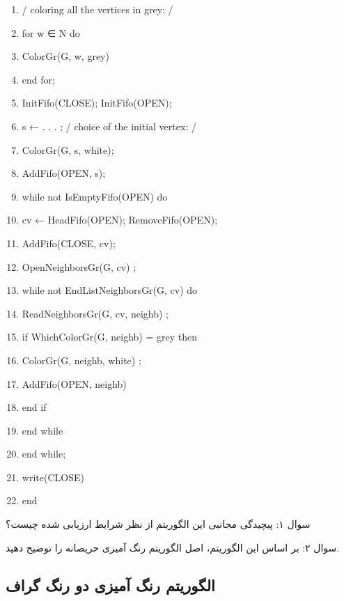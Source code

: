 \documentclass{book} %
\begin{document}
\begin{latin}
    
    \begin{enumerate}
        
        \item / coloring all the vertices in grey: /
        \item for w ∈ N do
        \item   ColorGr(G, w, grey)
        \item end for;
        \item InitFifo(CLOSE); InitFifo(OPEN);
        \item s ← . . . ; / choice of the initial vertex: /
        \item ColorGr(G, s, white);
        \item AddFifo(OPEN, s);
        \item while not IsEmptyFifo(OPEN) do
        \item   cv ← HeadFifo(OPEN); RemoveFifo(OPEN);
        \item   AddFifo(CLOSE, cv);
        \item   OpenNeighborsGr(G, cv) ;
        \item   while not EndListNeighborsGr(G, cv) do
        \item   ReadNeighborsGr(G, cv, neighb) ;
        \item   if WhichColorGr(G, neighb) = grey then
        \item       ColorGr(G, neighb, white) ;
        \item       AddFifo(OPEN, neighb)
        \item   end if
        \item end while
        \item end while;
        \item write(CLOSE) 
        \item end
        
        
    \end{enumerate}
    
\end{latin}

سوال ۱: پیچیدگی مجانبی این الگوریتم از نظر شرایط ارزیابی شده چیست؟

سوال ۲: بر اساس این الگوریتم، اصل الگوریتم رنگ آمیزی حریصانه را توضیح دهید.

\subsection*{الگوریتم رنگ آمیزی دو رنگ گراف}
\end{document}
